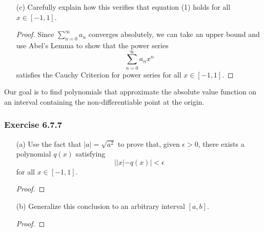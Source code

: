\begin{enumerate}
\begin{proof}[Solution]
\begin{align*}
        &= \frac{ -1  }{ (2n-1)  }  \cdot \frac{ 1 \cdot 3 \cdot 5 \dotsb (2n-1)  }{ 2 \cdot 4 \cdot 6 \dotsb 2n  } \\     
        &= -\frac{ c_n }{ 2n-1 }.  
        \end{align*}
        Since \( c_n < \frac{ 2 }{ \sqrt{ 2n-1 }  }  \) for \( n \geq 1  \), we can write 
        \[  | a_n |  = \frac{ c_{n} }{ 2n-1 } < \frac{ 2 }{ (2n-1)\sqrt{ 2n+1 }  }    \]
        which creates a series 
        \[  \sum_{ n=1 }^{ \infty  } \frac{ 2 }{ (2n-1) \sqrt{ 2n+1 }  }     \]
        that converges via the root test. Hence, we have \( \sum_{ n=0 }^{ \infty  } a_n  \) converges absolutely.
        \end{proof}
    \item[(c)] Carefully explain how this verifies that equation (1) holds for all \( x \in [-1,1] \).
        \begin{proof}
        Since \( \sum_{ n=0 }^{ \infty  } a_n  \) converges absolutely, we can take an upper bound and use Abel's Lemma to show that the power series 
        \[ \sum_{ n=0  }^{ \infty  } a_n x^{n}  \] satisfies the Cauchy Criterion for power series for all \( x \in [-1,1] \).
        \end{proof}
\end{enumerate}

Our goal is to find polynomials that approximate the absolute value function on an interval containing the non-differentiable point at the origin.

\subsubsection{Exercise 6.7.7} 
\begin{enumerate}
    \item[(a)] Use the fact that \( | a  |  = \sqrt{ a^{2} }  \) to prove that, given \( \epsilon > 0  \), there exists a polynomial \( q(x)  \) satisfying 
        \[  | | x  | - q(x)  | < \epsilon \]
        for all \( x \in [-1,1] \).
        \begin{proof}
        
        \end{proof}
    \item[(b)] Generalize this conclusion to an arbitrary interval \( [a,b] \).
        \begin{proof}
        
        \end{proof}
\end{enumerate}









